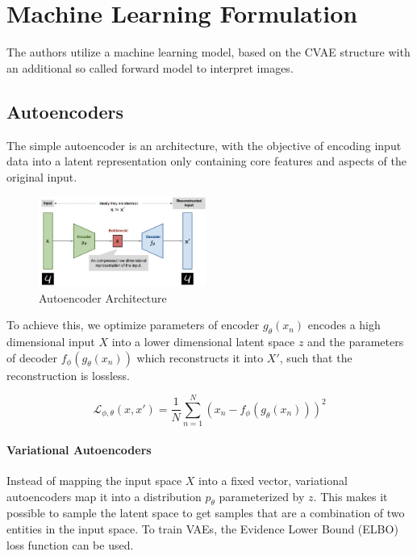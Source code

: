 \documentclass[a4paper,10pt,twocolumn]{article}
\begin{document}
    \section{Machine Learning Formulation}

        The authors utilize a machine learning model, based on the CVAE structure with 
        an additional so called forward model to interpret images\cite{minartz_cpm}. 

        \subsection{Autoencoders}
            The simple autoencoder is an architecture, with the 
            objective of encoding input data into a latent representation only 
            containing core features and aspects of the original input\cite{weng_autocoders}.
            
            \begin{figure}[H]
                \centering
                \includegraphics[width=0.49\textwidth]{../images/autoencoder-architecture.png}
                \caption{Autoencoder Architecture}\label{fig:autoencoder}
            \end{figure}

            To achieve this, we optimize parameters of encoder $g_{\theta} ({x_n})$ 
            encodes a high dimensional input $X$ into a lower dimensional latent space $z$ 
            and the parameters of decoder $f_{\phi} (g_{\theta} ({x_n}))$ which reconstructs it into $X'$,
            such that the reconstruction is lossless.

            \begin{equation}
                \mathcal{L}_{\phi, \theta}({x}, {x'}) = \frac{1}{N} \sum_{n=1}^{N} ({x_n} - f_{\phi} (g_{\theta} ({x_n})))^2
                \label{eq:lossfunc}
            \end{equation}
            
            \paragraph{Variational Autoencoders}
            Instead of mapping the input space $X$ into a fixed vector, variational autoencoders
            map it into a distribution $p_\theta$ parameterized by $z$\cite{rocca_vaes}.
            This makes it possible to sample the latent space to get samples that are a combination
            of two entities in the input space.
            To train VAEs, the Evidence Lower Bound (ELBO) loss function can be used.
\end{document}
